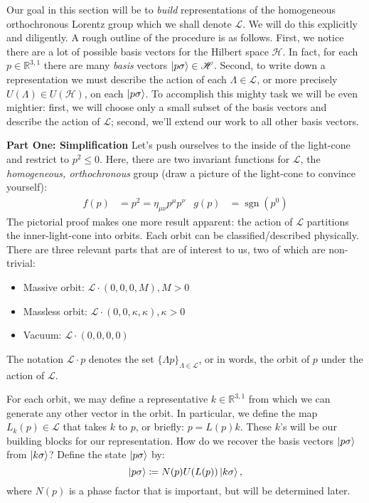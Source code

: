 \documentclass[10pt]{article}
\newcommand{\bR}{\mathbb{R}}
\newcommand{\ms}{\mathscr}
\newcommand{\sg}{\sigma}
\theoremstyle{plain}
\theoremstyle{definition}
\theoremstyle{remark}
\DeclareMathOperator{\sgn}{sgn}
\begin{document}
Our goal in this section will be to \emph{build} representations of
the homogeneous orthochronous Lorentz group which we shall denote $\ms
L$. We will do this explicitly and diligently. A rough outline of the
procedure is as follows. First, we notice there are a lot of possible
basis vectors for the Hilbert space $\ms H$. In fact, for each $p\in
\bR^{3,1}$ there are many \emph{basis} vectors $\ket{p\sg} \in \ms H$.
Second, to write down a representation we must describe the action of
each $\Lambda\in\ms L$, or more precisely $U(\Lambda)\in U(\ms H)$, on
each $\ket{p\sg}$. To accomplish this mighty task we will be even
mightier: first, we will choose only a small subset of the basis
vectors and describe the action of $\ms L$; second, we'll extend our
work to all other basis vectors.

\textbf{Part One: Simplification}
Let's push ourselves to the inside of the light-cone and restrict to
$p^2 \le 0$. Here, there are two invariant functions for $\ms L$, the
\emph{homogeneous, orthochronous} group (draw a picture of the
light-cone to convince yourself):
\begin{align*}
    f(p) &= p^2 = \eta_{\mu\nu}p^\mu p^\nu &
    g(p) &= \sgn(p^0)
\end{align*}
The pictorial proof makes one more result apparent: the action of $\ms
L$ partitions the inner-light-cone into orbits. Each orbit can be
classified/described physically. There are three relevant parts that
are of interest to us, two of which are non-trivial:
\begin{itemize}
    \item Massive orbit: $\ms L\cdot (0,0,0,M), M>0$
    \item Massless orbit: $\ms L\cdot (0,0,\kappa,\kappa),\kappa>0$
    \item Vacuum: $\ms L\cdot (0,0,0,0)$
\end{itemize}
The notation $\ms L \cdot p$ denotes the set $\{\Lambda p\}_{\Lambda
\in\ms L}$, or in words, the orbit of $p$ under the action of $\ms L$.

For each orbit, we may define a representative $k\in\bR^{3,1}$ from
which we can generate any other vector in the orbit. In particular, we
define the map $L_k(p)\in\ms L$ that takes $k$ to $p$, or briefly: $p
= L(p)k$. These $k$'s will be our building blocks for our
representation.
%
How do we recover the basis vectors $\ket{p\sg}$ from $\ket{k\sg}$?
Define the state $\ket{p\sg}$ by: \[ \ket{p\sg} \coloneqq N(p)U(L(p))
\ket{k\sg},\] where $N(p)$ is a phase factor that is important, but
will be determined later.
\end{document}
